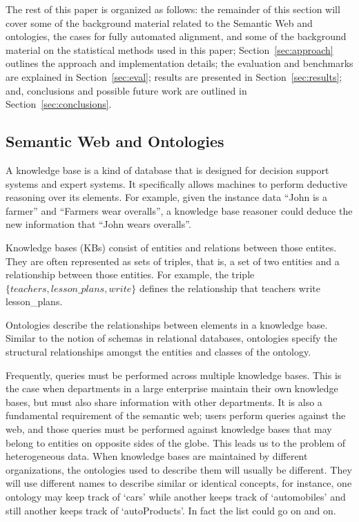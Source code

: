 \documentclass[letterpaper,twocolumn,12pt]{article}
\begin{document}
\noindent The rest of this paper is organized as follows: 
the remainder of this section will cover some of the background material related 
to the Semantic Web and ontologies, the cases for fully automated alignment, 
and some of the background material on the statistical methods used in this paper; 
Section~\ref{sec:approach} outlines the approach and implementation details; 
the evaluation and benchmarks are explained in Section~\ref{sec:eval}; 
results are presented in Section~\ref{sec:results}; and, 
conclusions and possible future work are outlined in Section~\ref{sec:conclusions}.

\subsection{Semantic Web and Ontologies}
\label{subsec:semanticweb}

A knowledge base is a kind of database that is designed 
for decision support systems and expert systems. It specifically allows
machines to perform deductive reasoning over its elements.
For example, given the instance data ``John is a farmer'' and ``Farmers
wear overalls'', a knowledge base reasoner could deduce the new information
that ``John wears overalls''.

Knowledge bases (KBs) consist of entities and
relations between those entites. They are often represented as sets of
triples, that is, a set of two entities and a relationship between those
entities. For example, the triple ${\{teachers, lesson\_plans, write\}}$
defines the relationship that teachers write lesson\_plans.

Ontologies describe the relationships between elements in a knowledge base.
Similar to the notion of schemas in relational databases, ontologies specify
the structural relationships amongst the entities and classes of the ontology.

Frequently, queries must be performed across multiple knowledge bases. This is the
case when departments in a large enterprise maintain their own knowledge bases,
but must also share information with other departments. It is also a fundamental
requirement of the semantic web; users perform queries against the web,
and those queries must be performed against knowledge bases that may belong to 
entities on opposite sides of the globe. This leads us to the problem of heterogeneous
data. When knowledge bases are maintained by different organizations, the ontologies
used to describe them will usually be different. They will use different names
to describe similar or identical concepts, for instance, one ontology may keep track
of `cars' while another keeps track of `automobiles' and still another keeps track of 
`autoProducts'. In fact the list could go on and on.
\end{document}
